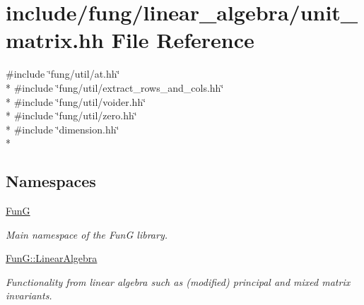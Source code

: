 \hypertarget{unit__matrix_8hh}{}\section{include/fung/linear\+\_\+algebra/unit\+\_\+matrix.hh File Reference}
\label{unit__matrix_8hh}
{\ttfamily \#include \char`\"{}fung/util/at.\+hh\char`\"{}}\\*
{\ttfamily \#include \char`\"{}fung/util/extract\+\_\+rows\+\_\+and\+\_\+cols.\+hh\char`\"{}}\\*
{\ttfamily \#include \char`\"{}fung/util/voider.\+hh\char`\"{}}\\*
{\ttfamily \#include \char`\"{}fung/util/zero.\+hh\char`\"{}}\\*
{\ttfamily \#include \char`\"{}dimension.\+hh\char`\"{}}\\*
\subsection*{Namespaces}
\begin{DoxyCompactItemize}
\item 
 \hyperlink{namespaceFunG}{FunG}
\begin{DoxyCompactList}\small\item\em Main namespace of the FunG library. \end{DoxyCompactList}\item 
 \hyperlink{namespaceFunG_1_1LinearAlgebra}{Fun\+G\+::\+Linear\+Algebra}
\begin{DoxyCompactList}\small\item\em Functionality from linear algebra such as (modified) principal and mixed matrix invariants. \end{DoxyCompactList}\end{DoxyCompactItemize}
